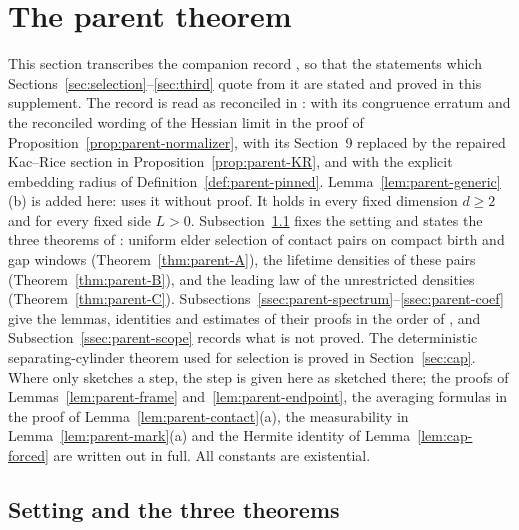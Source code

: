 \section{The parent theorem}\label{sec:parent}

This section transcribes the companion record \cite{parentP}, so that the statements which Sections~\ref{sec:selection}--\ref{sec:third} quote from it are stated and proved in this supplement. The record is read as reconciled in \cite{parentREC}: with its congruence erratum and the reconciled wording of the Hessian limit in the proof of Proposition~\ref{prop:parent-normalizer}, with its Section~9 replaced by the repaired Kac--Rice section in Proposition~\ref{prop:parent-KR}, and with the explicit embedding radius of Definition~\ref{def:parent-pinned}. Lemma~\ref{lem:parent-generic}(b) is added here: \cite{parentP} uses it without proof. It holds in every fixed dimension $d\ge2$ and for every fixed side $L>0$. Subsection~\ref{ssec:parent-setting} fixes the setting and states the three theorems of \cite{parentP}: uniform elder selection of contact pairs on compact birth and gap windows (Theorem~\ref{thm:parent-A}), the lifetime densities of these pairs (Theorem~\ref{thm:parent-B}), and the leading law of the unrestricted densities (Theorem~\ref{thm:parent-C}). Subsections~\ref{ssec:parent-spectrum}--\ref{ssec:parent-coef} give the lemmas, identities and estimates of their proofs in the order of \cite{parentP}, and Subsection~\ref{ssec:parent-scope} records what is not proved. The deterministic separating-cylinder theorem used for selection is proved in Section~\ref{sec:cap}. Where \cite{parentP} only sketches a step, the step is given here as sketched there; the proofs of Lemmas~\ref{lem:parent-frame} and~\ref{lem:parent-endpoint}, the averaging formulas in the proof of Lemma~\ref{lem:parent-contact}(a), the measurability in Lemma~\ref{lem:parent-mark}(a) and the Hermite identity of Lemma~\ref{lem:cap-forced} are written out in full. All constants are existential.

\subsection{Setting and the three theorems}\label{ssec:parent-setting}

